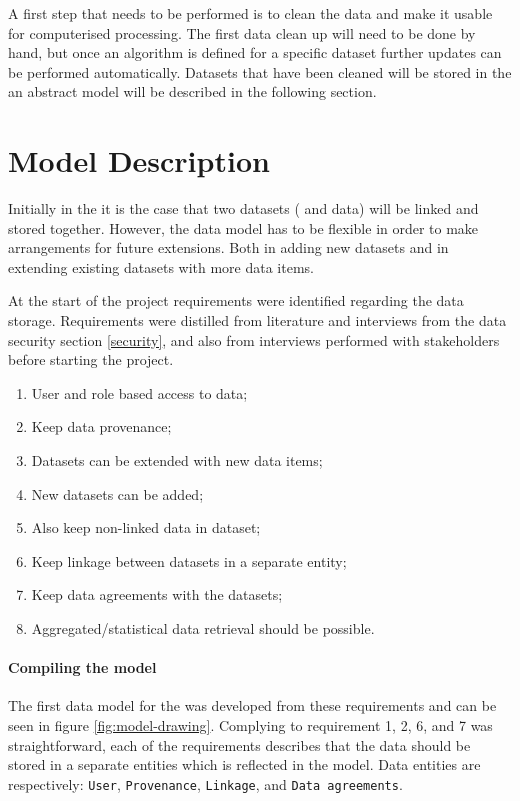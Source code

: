 A first step that needs to be performed is to clean the data and make it usable for computerised processing.
The first data clean up will need to be done by hand, but once an algorithm is defined for a specific dataset further updates can be performed automatically.
Datasets that have been cleaned will be stored in the \ivfsystem{} an abstract model will be described in the following section.

\section{Model Description}
\label{datamodel-model-description}

Initially in the \project it is the case that two datasets (\IVF{} and \PRN{} data) will be linked and stored together.
However, the data model has to be flexible in order to make arrangements for future extensions. 
Both in adding new datasets and in extending existing datasets with more data items.

At the start of the project requirements were identified regarding the data storage. 
Requirements were distilled from literature and interviews from the data security section \ref{security}, and also from interviews performed with stakeholders before starting the project.

\begin{enumerate}[topsep=0pt, itemsep=-1ex]
	\item User and role based access to data;
	\item Keep data provenance;
	\item Datasets can be extended with new data items;
	\item New datasets can be added;
	\item Also keep non-linked data in dataset;
	\item Keep linkage between datasets in a separate entity;
	\item Keep data agreements with the datasets;
	\item Aggregated/statistical data retrieval should be possible.
\end{enumerate}

\paragraph{Compiling the model}
\label{datamodel-compiling}

The first data model for the \ivfsystem{} was developed from these requirements and can be seen in figure \ref{fig:model-drawing}.
Complying to requirement 1, 2, 6, and 7 was straightforward, each of the requirements describes that the data should be stored in a separate entities which is reflected in the model.
Data entities are respectively: {\tt User}, {\tt Provenance}, {\tt Linkage}, and {\tt Data agreements}.

